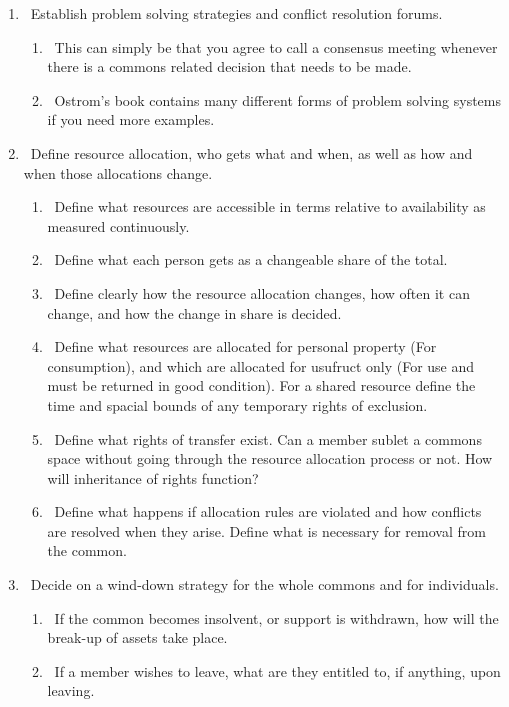 \begin{enumerate}
\begin{enumerate}
	 
	\end{enumerate}
	
	\item \checkbox\ Establish problem solving strategies and conflict resolution forums. 
		\begin{enumerate}
	 \item \checkbox\ This can simply be that you agree to call a consensus meeting whenever there is a commons related decision that needs to be made. 
	 \item \checkbox\ Ostrom's book contains many different forms of problem solving systems if you need more examples. 	
	\end{enumerate}
	
	\item \checkbox\ Define resource allocation, who gets what and when, as well as how and when those allocations change. 
	\begin{enumerate}
		\item \checkbox\ Define what resources are accessible in terms relative to availability as measured continuously.
		\item \checkbox\ Define what each person gets as a changeable share of the total. 
		\item \checkbox\ Define clearly how the resource allocation changes, how often it can change, and how the change in share is decided. 
		\item \checkbox\ Define what resources are allocated for personal property (For consumption), and which are allocated for usufruct only (For use and must be returned in good condition). For a shared resource define the time and spacial bounds of any temporary rights of exclusion. 
		\item \checkbox\ Define what rights of transfer exist. Can a member sublet a commons space without going through the resource allocation process or not. How will inheritance of rights function?
		\item \checkbox\ Define what happens if allocation rules are violated and how conflicts are resolved when they arise. Define what is necessary for removal from the common. 
	\end{enumerate}
	\item \checkbox\ Decide on a wind-down strategy for the whole commons and for individuals. 
	\begin{enumerate}
		\item \checkbox\ If the common becomes insolvent, or support is withdrawn, how will the break-up of assets take place.
		\item \checkbox\ If a member wishes to leave, what are they entitled to, if anything, upon leaving. 	
	\end{enumerate}	
\end{enumerate}
